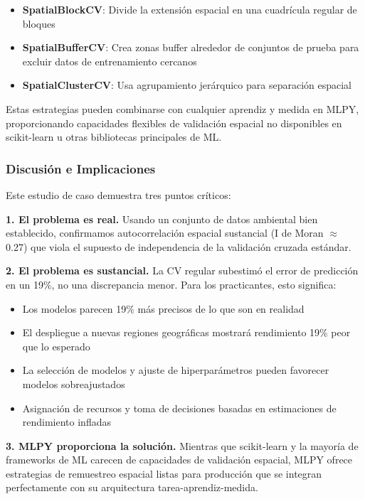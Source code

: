 \begin{itemize}
\item \textbf{SpatialBlockCV}: Divide la extensión espacial en una cuadrícula regular de bloques
\item \textbf{SpatialBufferCV}: Crea zonas buffer alrededor de conjuntos de prueba para excluir datos de entrenamiento cercanos
\item \textbf{SpatialClusterCV}: Usa agrupamiento jerárquico para separación espacial
\end{itemize}

Estas estrategias pueden combinarse con cualquier aprendiz y medida en MLPY, proporcionando capacidades flexibles de validación espacial no disponibles en scikit-learn u otras bibliotecas principales de ML.

\subsubsection{Discusión e Implicaciones}

Este estudio de caso demuestra tres puntos críticos:

\textbf{1. El problema es real.} Usando un conjunto de datos ambiental bien establecido, confirmamos autocorrelación espacial sustancial (I de Moran $\approx$ 0.27) que viola el supuesto de independencia de la validación cruzada estándar.

\textbf{2. El problema es sustancial.} La CV regular subestimó el error de predicción en un 19\%, no una discrepancia menor. Para los practicantes, esto significa:
\begin{itemize}
\item Los modelos parecen 19\% más precisos de lo que son en realidad
\item El despliegue a nuevas regiones geográficas mostrará rendimiento 19\% peor que lo esperado
\item La selección de modelos y ajuste de hiperparámetros pueden favorecer modelos sobreajustados
\item Asignación de recursos y toma de decisiones basadas en estimaciones de rendimiento infladas
\end{itemize}

\textbf{3. MLPY proporciona la solución.} Mientras que scikit-learn y la mayoría de frameworks de ML carecen de capacidades de validación espacial, MLPY ofrece estrategias de remuestreo espacial listas para producción que se integran perfectamente con su arquitectura tarea-aprendiz-medida.

